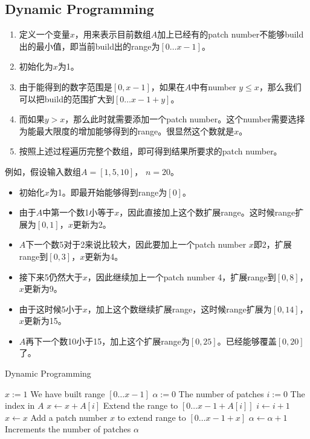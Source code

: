 \subsection{Dynamic Programming}
\begin{enumerate}
\item 定义一个变量$ x $，用来表示目前数组$A$加上已经有的patch number不能够build出的最小值，即当前build出的range为$[0\ldots x-1]$。
\item 初始化为$x$为1。
\item 由于能得到的数字范围是$[0, x-1]$，如果在$A$中有number $y\leq x$，那么我们可以把build的范围扩大到$[0\ldots x-1+y]$。
\item 而如果$y>x$，那么此时就需要添加一个patch number。这个number需要选择为能最大限度的增加能够得到的range。很显然这个数就是$x$。
\item 按照上述过程遍历完整个数组，即可得到结果所要求的patch number。
\end{enumerate}
例如，假设输入数组$A = [1, 5, 10] $， $ n=20 $。
\begin{itemize}
\item 初始化$x$为1。即最开始能够得到range为$[0]$。
\item 由于$A$中第一个数1小等于$x$，因此直接加上这个数扩展range。这时候range扩展为$[0, 1]$，$x$更新为2。
\item $A$下一个数5对于2来说比较大，因此要加上一个patch number $x$即2，扩展range到$[0, 3]$，$x$更新为4。
\item 接下来5仍然大于$x$，因此继续加上一个patch number 4，扩展range到$[0,8]$，$x$更新为9。
\item 由于这时候5小于$x$，加上这个数继续扩展range，这时候range扩展为$[0, 14]$，$x$更新为15。
\item  $A$再下一个数10小于15，加上这个扩展range为$[0, 25]$。已经能够覆盖$[0,20]$了。
\end{itemize}

\setcounter{algorithm}{0}
\begin{algorithm}[H]
\caption{Dynamic Programming}
\begin{algorithmic}[1]
\State $x:=1$ \Comment We have built range $ [0\ldots x-1] $
\State $\alpha:=0$ \Comment The number of patches
\State $i:=0$ \Comment The index in $A$
\State $x\gets x+A[i]$ \Comment Extend the range to $[0\ldots x-1+A[i]]$
\State $i\gets i+1$
\Else
\State $x\gets x$ \Comment Add a patch number $x$ to extend range to $[0\ldots x-1+x]$
\State $\alpha\gets \alpha+1$ \Comment Increments the number of patches
\EndIf
\EndWhile
\State \Return $\alpha$
\EndProcedure
\end{algorithmic}
\end{algorithm}

